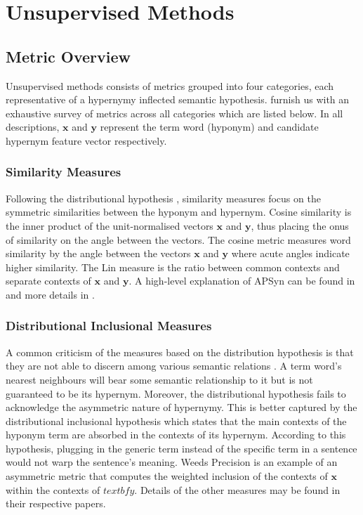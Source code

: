 \section{Unsupervised Methods}
\subsection{Metric Overview}
Unsupervised methods consists of metrics grouped into four categories, each representative of a hypernymy inflected semantic hypothesis.  \citeauthor{shwartz2017siege} furnish us with an exhaustive survey of metrics across all categories which are listed below.  In all descriptions, $\textbf{x}$ and $\textbf{y}$ represent the term word (hyponym) and candidate hypernym feature vector respectively.


\subsubsection{Similarity Measures}
Following the distributional hypothesis \citep{harris1954distributional}, similarity measures focus on the symmetric similarities between the hyponym and hypernym.  Cosine similarity is the inner product of the unit-normalised vectors $\textbf{x}$ and $\textbf{y}$, thus placing the onus of similarity on the angle between the vectors.   The cosine metric measures word similarity by the angle between the vectors $\textbf{x}$ and $\textbf{y}$ where acute angles indicate higher similarity.  The Lin measure is the ratio between common contexts and separate contexts of $\textbf{x}$ and $\textbf{y}$.  A high-level explanation of APSyn can be found in \citep{shwartz2017siege} and more details in \citep{santus2016unsupervised}.

\subsubsection{Distributional Inclusional Measures}
A common criticism of the measures based on the distribution hypothesis is that they are not able to discern among various semantic relations \citep{roller2014inclusive}.  A term word’s nearest neighbours will bear some semantic relationship to it but is not guaranteed to be its hypernym. Moreover, the distributional hypothesis fails to acknowledge the asymmetric nature of hypernymy.  This is better captured by the distributional inclusional hypothesis \citep{geffet2005distributional} which states that the main contexts of the hyponym term are absorbed in the contexts of its hypernym.  According to this hypothesis, plugging in the generic term instead of the specific term in a sentence would not warp the sentence’s meaning.  Weeds Precision \citep{weeds2003general} is an example of an asymmetric metric that computes the weighted inclusion of the contexts of $\textbf{x}$ within the contexts of $textbf{y}$.  Details of the other measures may be found in their respective papers.


